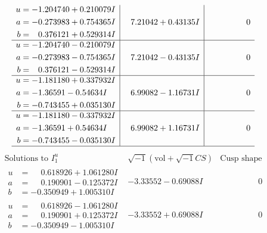 \documentclass[1p]{elsarticle_modified}
\theoremstyle{definition}
\newcommand{\I}{\sqrt{-1}}
\begin{document}
$$\begin{array}{c|c|c}
\begin{aligned}
u &= -1.204740 + 0.210079 I \\
a &= -0.273983 + 0.754365 I \\
b &= \phantom{-}0.376121 + 0.529314 I\end{aligned}
 & \phantom{-}7.21042 + 0.43135 I & \phantom{-0.000000 } 0 \\ \hline\begin{aligned}
u &= -1.204740 - 0.210079 I \\
a &= -0.273983 - 0.754365 I \\
b &= \phantom{-}0.376121 - 0.529314 I\end{aligned}
 & \phantom{-}7.21042 - 0.43135 I & \phantom{-0.000000 } 0 \\ \hline\begin{aligned}
u &= -1.181180 + 0.337932 I \\
a &= -1.36591 - 0.54634 I \\
b &= -0.743455 + 0.035130 I\end{aligned}
 & \phantom{-}6.99082 - 1.16731 I & \phantom{-0.000000 } 0 \\ \hline\begin{aligned}
u &= -1.181180 - 0.337932 I \\
a &= -1.36591 + 0.54634 I \\
b &= -0.743455 - 0.035130 I\end{aligned}
 & \phantom{-}6.99082 + 1.16731 I & \phantom{-0.000000 } 0\\
 \hline 
 \end{array}$$\newpage$$\begin{array}{c|c|c}  
\text{Solutions to }I^u_{1}& \I (\text{vol} + \sqrt{-1}CS) & \text{Cusp shape}\\
 \hline 
\begin{aligned}
u &= \phantom{-}0.618926 + 1.061280 I \\
a &= \phantom{-}0.190901 - 0.125372 I \\
b &= -0.350949 + 1.005310 I\end{aligned}
 & -3.33552 - 0.69088 I & \phantom{-0.000000 } 0 \\ \hline\begin{aligned}
u &= \phantom{-}0.618926 - 1.061280 I \\
a &= \phantom{-}0.190901 + 0.125372 I \\
b &= -0.350949 - 1.005310 I\end{aligned}
 & -3.33552 + 0.69088 I & \phantom{-0.000000 } 0 \\ \hline\begin{aligned}

\end{aligned}
\end{array}$$
\end{document}
